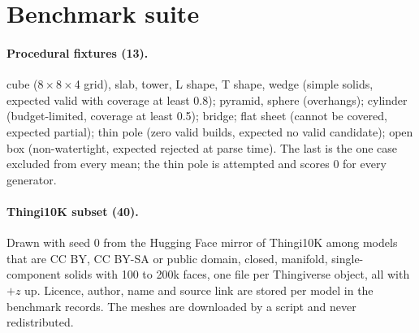 \section{Benchmark suite}
\label{app:suite}
\paragraph{Procedural fixtures (13).} cube (8\,$\times$\,8\,$\times$\,4 grid), slab, tower, L shape, T shape, wedge
(simple solids, expected valid with coverage at least 0.8); pyramid, sphere (overhangs); cylinder (budget-limited,
coverage at least 0.5); bridge; flat sheet (cannot be covered, expected partial); thin pole (zero valid builds,
expected no valid candidate); open box (non-watertight, expected rejected at parse time). The last is the one case
excluded from every mean; the thin pole is attempted and scores 0 for every generator.

\paragraph{Thingi10K subset (40).} Drawn with seed 0 from the Hugging Face mirror of Thingi10K among models that are
CC BY, CC BY-SA or public domain, closed, manifold, single-component solids with 100 to 200k faces, one file per
Thingiverse object, all with $+z$ up. Licence, author, name and source link are stored per model in the benchmark
records. The meshes are downloaded by a script and never redistributed.


